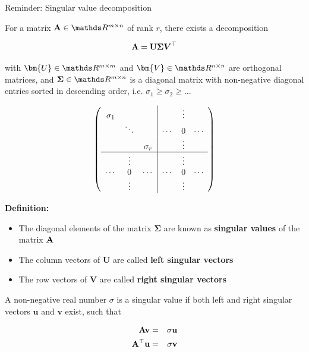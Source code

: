 \begin{vbframe}{Reminder: Singular value decomposition}

For a matrix $\Amat\in \R^{m \times n}$ of rank $r$, there exists a decomposition 

\vspace*{-0.4cm}
\begin{eqnarray*}
\mathbf{A} = \mathbf{U} \boldsymbol{\Sigma} \boldsymbol{V}^\top
\end{eqnarray*}

with $\bm{U} \in \R^{m \times m}$ and $\bm{V} \in \R^{n \times n}$ are orthogonal matrices, and $\boldsymbol{\Sigma}\in \R^{m \times n}$ is a diagonal matrix with non-negative diagonal entries sorted in descending order, i.e. $\sigma_1 \ge \sigma_2 \ge ... $

\begin{footnotesize}
$$
\left(\begin{array}{ccc|ccc}
\sigma_1 & & & & \vdots & \\
  & \ddots   &   & \cdots & 0      & \cdots \\
  &   & \sigma_r & & \vdots & \\
\hline
  &  \vdots  &   & & \vdots & \\
\cdots   &  0       & \cdots   & \cdots & 0      & \cdots \\
  &  \vdots  &   & & \vdots & \\

\end{array}\right)
$$
\end{footnotesize}

\framebreak 


\textbf{Definition:}
\begin{itemize}
\item The diagonal elements of the matrix $\boldsymbol{\Sigma}$ are known as \textbf{singular values} of the matrix $\mathbf{A}$
\item The column vectors of $\mathbf{U}$ are called \textbf{left singular vectors}
\item The row vectors of $\mathbf{V}$ are called \textbf{right singular vectors}
\end{itemize}

A non-negative real number $\sigma$ is a singular value if both left and right singular vectors $\mathbf{u}$ and $\mathbf{v}$ exist, such that

\begin{eqnarray*}
\mathbf{A} \mathbf{v} &=& \sigma \mathbf{u} \\
\mathbf{A}^\top \mathbf{u} &=& \sigma \mathbf{v}
\end{eqnarray*}



\end{vbframe}
